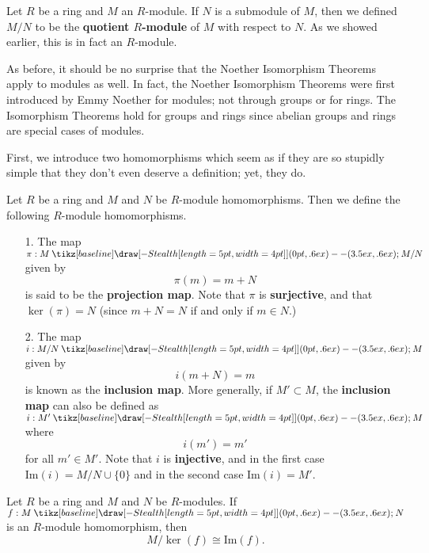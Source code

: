 \documentclass[12pt,letterpaper]{algebra_book}
\renewcommand{\to}{\mathbin{\tikz[baseline] \draw[-{Stealth[length=5pt,width=4pt]}] (0pt,.6ex) -- (3.5ex,.6ex);}}
\newcommand{\im}{\mbox{Im}}
\theoremstyle{definition}
\begin{document}
\begin{definition}
    Let $R$ be a ring and $M$ an $R$-module. If $N$ is a submodule
    of $M$, then we defined $M/N$ to be the \textbf{quotient
    $R$-module} of $M$ with respect to $N$. As we showed earlier,
    this is in fact an $R$-module.
\end{definition}

As before, it should be no surprise that the Noether Isomorphism
Theorems apply to modules as well. In fact, the Noether
Isomorphism Theorems were first introduced by Emmy Noether for
modules; not through groups or for rings. The Isomorphism Theorems
hold for groups and rings since abelian groups and rings are
special cases of modules. 

First, we introduce two homomorphisms which seem as if they are so stupidly
simple that they don't even deserve a definition; yet, they do. 

\begin{definition}
    Let $R$ be a ring and $M$ and $N$ be $R$-module homomorphisms.
    Then we define the following $R$-module homomorphisms.
    \begin{itemize}
        \item[1.] The map $\pi: M \to M/N$ given by 
        \[
            \pi(m) = m + N
        \] 
        is said to be the \textbf{projection map}. Note that $\pi$
        is
        \textbf{surjective}, and that $\ker(\pi) = N$ (since $m +
        N = N$ if and only if $m \in N$.)

        \item[2.] The map $i: M/N \to M$ given by 
        \[
            i(m + N) = m                
        \]
        is known as the \textbf{inclusion map}. More generally, if
        $M' \subset M$, the \textbf{inclusion map} can also be
        defined as $i: M' \to M$ where 
        \[
            i(m') = m'
        \]
        for all $m' \in M'$. Note that $i$ is \textbf{injective},
        and in the first case $\im(i) = M/N\cup \{0\}$ and in the
        second case $\im(i) = M'$.
    \end{itemize}
\end{definition}

\begin{thm}
    Let $R$ be a ring and $M$ and $N$ be $R$-modules. If $f: M \to
    N$ is an $R$-module homomorphism, then 
    \[
        M/\ker(f) \cong \im(f).  
    \]
    \vspace{-0.8cm}
\end{thm}
\end{document}
